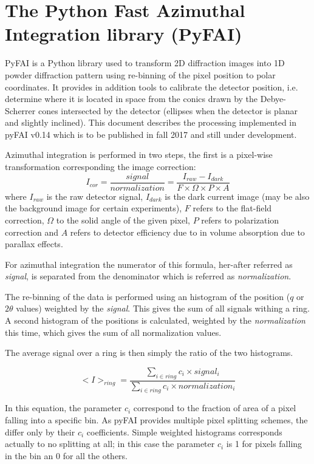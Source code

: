 \documentclass[preprint, pdf]{iucr}              %
\begin{document}
\section{The Python Fast Azimuthal Integration library (PyFAI)}

PyFAI is a Python \cite{python} library used to transform 2D diffraction images into
1D powder diffraction pattern using re-binning of the pixel position to polar coordinates.
It provides in addition tools to calibrate the detector position, i.e. determine
where it is located in space from the conics drawn by the Debye-Scherrer cones
intersected by the detector (ellipses when the detector is planar and slightly
inclined). This document describes the processing implemented in pyFAI
v0.14 which is to be published in fall 2017 and still under development.

Azimuthal integration is performed in two steps, the first is a pixel-wise
transformation corresponding the image correction:
$$
I_{cor} = \frac{signal}{normalization}  = \frac{I_{raw} - I_{dark}}{F \times
\Omega \times P \times A } $$
where $I_{raw}$ is the raw detector signal, $I_{dark}$ is the dark current
image (may be also the background image for certain experiments), $F$ refers to
the flat-field correction, $\Omega$ to the solid angle of the given pixel, $P$
refers to polarization correction and $A$ refers to detector efficiency due
to in volume absorption due to parallax effects.

For azimuthal integration the numerator of this formula, her-after referred as
\textit{signal}, is separated from the denominator which is referred as
\textit{normalization}.

The re-binning of the data is performed using an histogram of the position ($q$
or $2\theta$ values) weighted by the \textit{signal}.
This gives the sum of all signals withing a ring.
A second histogram of the positions is calculated, weighted by the
\textit{normalization} this time, which gives the sum of all normalization
values.

The average signal over a ring is then simply the ratio of the two histograms.

$$
<I>_{ring} = \frac{\sum\limits_{i \in ring} c_i \times signal_i}
                  {\sum\limits_{i \in ring} c_i \times normalization_i} 
$$

In this equation, the parameter $c_i$ correspond to the fraction of area of a
pixel falling into a specific bin. 
As pyFAI provides multiple pixel splitting schemes, the differ only by their
$c_i$ coefficients. 
Simple weighted histograms corresponds actually to no splitting at all; in this
case the parameter $c_i$ is 1 for pixels falling in the bin an 0 for all the
others.
  
\end{document}

